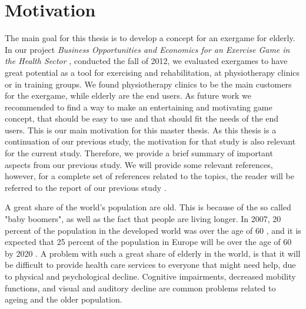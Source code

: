 \chapter{Motivation}
\label{chap:background}

The main goal for this thesis is to develop a concept for an exergame for elderly. In our project \emph{Business Opportunities and Economics for an Exercise Game in the Health Sector} \cite{project}, conducted the fall of 2012, we evaluated exergames to have great potential as a tool for exercising and rehabilitation, at physiotherapy clinics or in training groups. We found physiotherapy clinics to be the main customers for the exergame, while elderly are the end users. As future work we recommended to find a way to make an entertaining and motivating game concept, that should be easy to use and that should fit the needs of the end users. This is our main motivation for this master thesis. As this thesis is a continuation of our previous study, the motivation for that study is also relevant for the current study. Therefore, we provide a brief summary of important aspects from our previous study. We will provide some relevant references, however, for a complete set of references related to the topics, the reader will be referred to the report of our previous study \cite{project}.

A great share of the world's population are old. This is because of the so called "baby boomers", as well as the fact that people are living longer. In 2007, 20 percent of the population in the developed world was over the age of 60 \cite{dickinson2007methods}, and it is expected that 25 percent of the population in Europe will be over the age of 60 by 2020 \cite{ijsselsteijn2007digital}. A problem with such a great share of elderly in the world, is that it will be difficult to provide health care services to everyone that might need help, due to physical and psychological decline. Cognitive impairments, decreased mobility functions, and visual and auditory decline are common problems related to ageing and the older population.

